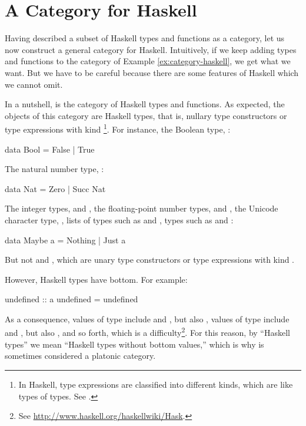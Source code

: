 \section{A Category for Haskell}
\label{sec:category-haskell}

Having described a subset of Haskell types and functions as a
category, let us now construct a general category for Haskell.
Intuitively, if we keep adding types and functions to the category of
Example \ref{ex:category-haskell}, we get what we want. But we have to
be careful because there are some features of Haskell which we cannot
omit.

In a nutshell, \hask is the category of Haskell types and functions.
As expected, the objects of this category are Haskell types, that is,
nullary type constructors or type expressions with kind
\texthaskell{*}\footnote{In Haskell, type expressions are classified
  into different kinds, which are like types of types. See
  \parencite[§ 4.1.1]{peytonjones-2003}.}. For instance, the Boolean
type, :
\begin{codehaskell}
data Bool = False | True
\end{codehaskell}
The natural number type, :
\begin{codehaskell}
data Nat = Zero | Succ Nat
\end{codehaskell}
The integer types,  and , the
floating-point number types,  and
, the Unicode character type, ,
lists of types such as \texthaskell{[Bool]} and \texthaskell{[Nat]},
 types such as  and
:
\begin{codehaskell}
data Maybe a = Nothing | Just a
\end{codehaskell}
But not \texthaskell{[]} and , which are unary type
constructors or type expressions with kind \texthaskell{* -> *}.

\begin{convention}
  \label{con:hask}

  However, Haskell types have bottom. For example:
  \begin{codehaskell}
undefined :: a
undefined = undefined
  \end{codehaskell}
  As a consequence, values of type  include
   and , but also
  , values of type  include
   and , but also
  , and so forth, which is a
  difficulty\footnote{See
    \url{http://www.haskell.org/haskellwiki/Hask}.}. For this reason,
  by ``Haskell types'' we mean ``Haskell types without bottom
  values,'' which is why \hask is sometimes considered a platonic
  category.

\end{convention}

